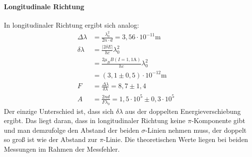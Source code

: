 \paragraph{Longitudinale Richtung}
In longitudinaler Richtung ergibt sich analog:
\begin{align*}
\Delta \lambda &= \frac{\lambda_0^2}{2n\cdot d} = 3,56 \cdot 10^{-11} \si{\meter}\\
\delta \lambda &= \frac{|2\delta E|}{hc}\lambda_0^2\\
	&= \frac{2\mu_B B(I = 1,1\si{\ampere})}{hc}\lambda_0^2\\
	&= (3,1\pm 0,5) \cdot 10^{-12} \si{\meter}\\
F &= \frac{\Delta \lambda}{\delta\lambda} = 8,7 \pm 1,4\\
A&= \frac{2 n d}{F \lambda_0} = 1,5\cdot 10^5 \pm 0,3 \cdot 10^5
\end{align*}
Der einzige Unterschied ist, dass sich $\delta \lambda$ aus der doppelten Energieverschiebung ergibt. Das liegt daran, dass in longitudinaler Richtung keine $\pi$-Komponente gibt und man demzufolge den Abstand der beiden $\sigma$-Linien nehmen muss, der doppelt so groß ist wie der Abstand zur $\pi$-Linie. Die theoretischen Werte liegen bei beiden Messungen im Rahmen der Messfehler.\\

